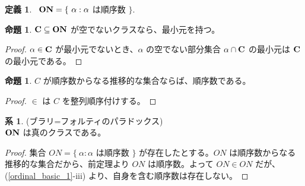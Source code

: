 \documentclass{jsarticle}
\theoremstyle{definition}
\newtheorem*{definition*}{定義}
\newtheorem{proposition}[theorem]{命題}
\newtheorem{corollary}[theorem]{系}
\begin{document}
    \begin{definition*} \
        $\bf{ON} = \{\ \alpha : \alpha$ は順序数 $\}.$
    \end{definition*}
    \begin{proposition} $\bf{C} \subseteq \bf{ON}$ が空でないクラスなら、最小元を持つ。
    \end{proposition}
    \begin{proof}
        $\alpha \in \bf{C}$ が最小元でないとき、$\alpha$ の空でない部分集合 $\alpha \cap \bf{C}$ の最小元は $\bf{C}$ の最小元である。
    \end{proof}
    \begin{proposition} \label{ordinal_basic_2} $C$ が順序数からなる推移的な集合ならば、順序数である。
    \end{proposition}
    \begin{proof}
        $\in$ は $C$ を整列順序付けする。
    \end{proof}
    \begin{corollary} \label{Burali_Forti_Paradox} (ブラリ=フォルティのパラドックス) \\
    $\bf{ON}$ は真のクラスである。
    \end{corollary}
    \begin{proof}
        集合 $ON = \{\ \alpha : \alpha$ は順序数 $\}$ が存在したとする。$ON$ は順序数からなる推移的な集合だから、前定理より $ON$ は順序数。よって $ON \in ON$ だが、(\ref{ordinal_basic_1}-iii) より、自身を含む順序数は存在しない。
    \end{proof}
    \vspace{1ex}
    
\end{document}
